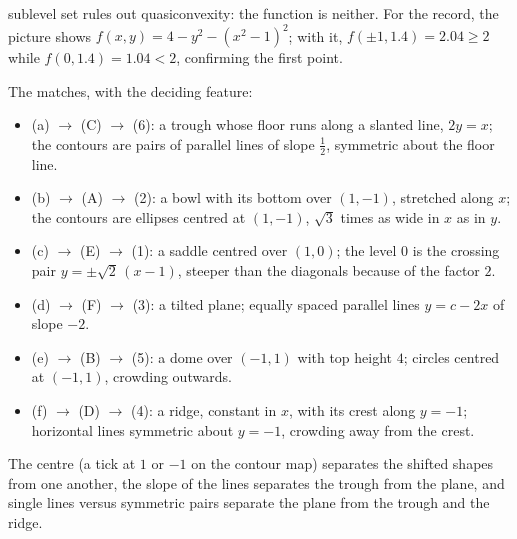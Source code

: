 \begin{solutions}
        sublevel set rules out quasiconvexity: the function is neither. For
        the record, the picture shows
        $f(x,y)=4-y^{2}-(x^{2}-1)^{2}$; with it, $f(\pm1,1.4)=2.04\ge2$
        while $f(0,1.4)=1.04<2$, confirming the first point.
  \item The matches, with the deciding feature:
        \begin{itemize}[leftmargin=1.2em,itemsep=0.2ex]
          \item (a) $\to$ (C) $\to$ (6): a trough whose floor runs along a
                slanted line, $2y=x$; the contours are pairs of parallel
                lines of slope $\tfrac12$, symmetric about the floor line.
          \item (b) $\to$ (A) $\to$ (2): a bowl with its bottom over
                $(1,-1)$, stretched along $x$; the contours are ellipses
                centred at $(1,-1)$, $\sqrt3$ times as wide in $x$ as in
                $y$.
          \item (c) $\to$ (E) $\to$ (1): a saddle centred over $(1,0)$; the
                level $0$ is the crossing pair $y=\pm\sqrt2\,(x-1)$, steeper
                than the diagonals because of the factor $2$.
          \item (d) $\to$ (F) $\to$ (3): a tilted plane; equally spaced
                parallel lines $y=c-2x$ of slope $-2$.
          \item (e) $\to$ (B) $\to$ (5): a dome over $(-1,1)$ with top
                height $4$; circles centred at $(-1,1)$, crowding outwards.
          \item (f) $\to$ (D) $\to$ (4): a ridge, constant in $x$, with
                its crest along $y=-1$; horizontal lines symmetric about
                $y=-1$, crowding away from the crest.
        \end{itemize}
        The centre (a tick at $1$ or $-1$ on the contour map) separates
        the shifted shapes from one another, the slope of the lines
        separates the trough from the plane, and single lines versus
        symmetric pairs separate the plane from the trough and the ridge.
\end{solutions}
